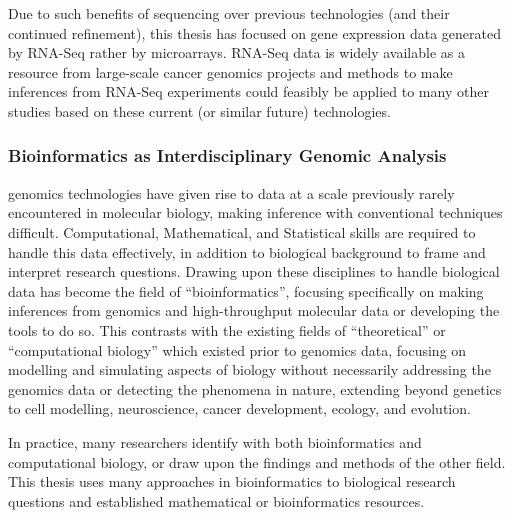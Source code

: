 
Due to such benefits of sequencing over previous technologies (and their continued refinement), this thesis has focused on gene expression data generated by \gls{RNA-Seq} rather by microarrays. \gls{RNA-Seq} data is widely available as a resource from large-scale cancer \gls{genomics} projects and methods to make inferences from \gls{RNA-Seq} experiments could feasibly be applied to many other studies based on these current (or similar future) technologies.


\subsubsection{Bioinformatics as Interdisciplinary Genomic Analysis}
\Gls{genomics} technologies have given rise to data at a scale previously rarely encountered in molecular biology, making inference with conventional techniques difficult. Computational, Mathematical, and Statistical skills are required to handle this data effectively, in addition to biological background to frame and interpret research questions. Drawing upon these disciplines to handle biological data has become the field of ``\Gls{bioinformatics}'', focusing specifically on making inferences from \gls{genomics} and high-throughput molecular data or developing the tools to do so. This contrasts with the existing fields of ``theoretical'' or ``computational biology'' which existed prior to \gls{genomics} data, focusing on modelling and simulating aspects of biology without necessarily addressing the \gls{genomics} data or detecting the phenomena in nature, extending beyond genetics to cell modelling, neuroscience, cancer development, ecology, and evolution.

In practice, many researchers identify with both \gls{bioinformatics} and computational biology, or draw upon the findings and methods of the other field. This thesis uses many approaches in \gls{bioinformatics} to biological research questions and established mathematical or \gls{bioinformatics} resources.

